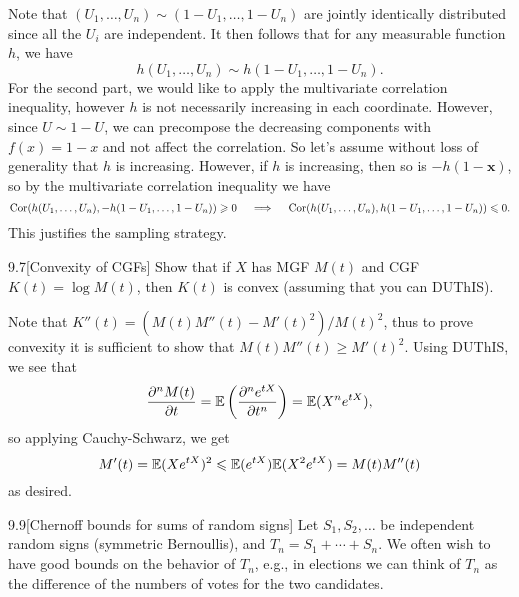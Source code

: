 \documentclass{pset}
\begin{document}
\begin{parts}
  Note that $(U_1, \ldots, U_n)\sim (1-U_1, \ldots, 1-U_n)$ are jointly identically distributed since all the $U_i$ are independent. It then follows that for any measurable function $h$, we have 
  \[
    h(U_1,\ldots, U_n) \sim h(1-U_1,\ldots, 1-U_n).
  \]
  For the second part, we would like to apply the multivariate correlation inequality, however $h$ is not necessarily increasing in each coordinate. However, since $U\sim 1-U$, we can precompose the decreasing components with $f(x)=1-x$ and not affect the correlation. So let's assume without loss of generality that $h$ is increasing. However, if $h$ is increasing, then so is $-h(1-\mathbf{x})$, so by the multivariate correlation inequality we have
  \[
    \textrm{Cor}(h(U_1,\ldots, U_n), -h(1-U_1, \ldots, 1-U_n)) \geqslant 0 \quad \implies \quad \textrm{Cor}(h(U_1,\ldots, U_n), h(1-U_1, \ldots, 1-U_n)) \leqslant 0.
  \]
  This justifies the sampling strategy.
\end{parts}

\begin{problem}{9.7}[Convexity of CGFs]
  Show that if $X$ has MGF $M(t)$ and CGF $K(t)=\log M(t)$, then $K(t)$ is convex (assuming that you can DUThIS).
\end{problem}

\begin{solution}
  Note that $K''(t)  =(M(t)M''(t) - M'(t)^2)/M(t)^2$, thus to prove convexity it is sufficient to show that $M(t)M''(t) \geq M'(t)^2$. Using DUThIS, we see that
  \[
    \frac{\partial^n M(t)}{\partial t} = \mathbb{E}\left(\frac{\partial^n e^{tX}}{\partial t^n}\right) = \mathbb{E}(X^n e^{tX}),
  \]
  so applying Cauchy-Schwarz, we get
  \[
    M'(t)=\mathbb{E}(Xe^{tX})^2 \leqslant \mathbb{E}(e^{tX})\mathbb{E}(X^2e^{tX}) = M(t)M''(t)
  \]
  as desired.
\end{solution}

\begin{problem}{9.9}[Chernoff bounds for sums of random signs]
  Let $S_1,S_2,\ldots$ be independent random signs (symmetric Bernoullis), and $T_n =S_1+\cdots+S_n$. We often wish to have good bounds on the behavior of $T_n$, e.g., in elections we can think of $T_n$ as the difference of the numbers of votes for the two candidates.
\end{problem}
\end{document}

